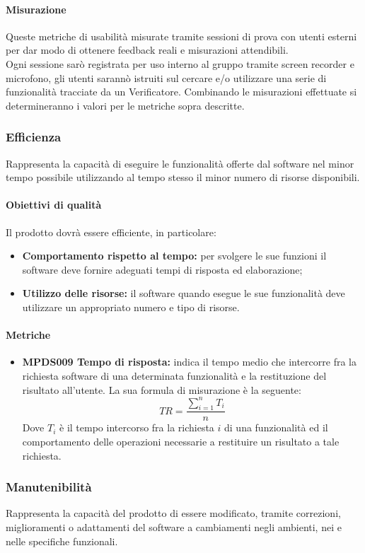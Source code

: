 \documentclass[NormeDiProgetto.tex]{subfiles}
\begin{document}
	\paragraph{Misurazione}
	Queste metriche di usabilità misurate tramite sessioni di prova con utenti esterni per dar modo di ottenere feedback reali e misurazioni attendibili.\\ Ogni sessione sarò registrata per uso interno al gruppo tramite screen recorder e microfono, gli utenti sarannò istruiti sul cercare e/o utilizzare una serie di funzionalità tracciate da un Verificatore.
	Combinando le misurazioni effettuate si determineranno i valori per le metriche sopra descritte.
	
	\subsubsection{Efficienza}
	Rappresenta la capacità di eseguire le funzionalità offerte dal software nel minor tempo possibile utilizzando al tempo stesso il minor numero di risorse disponibili.
	\paragraph{Obiettivi di qualità}
	Il prodotto dovrà essere efficiente, in particolare:
	\begin{itemize}
		\item \textbf{Comportamento rispetto al tempo:} per svolgere le sue funzioni il software deve fornire adeguati tempi di risposta ed elaborazione;
		\item \textbf{Utilizzo delle risorse:} il software quando esegue le sue funzionalità deve utilizzare un appropriato numero e tipo di risorse.
	\end{itemize}
	\paragraph{Metriche}
	\begin{itemize}
		\item \textbf{MPDS009 Tempo di risposta:} indica il tempo medio che intercorre fra la richiesta software di una determinata funzionalità e la restituzione del risultato all'utente. La sua formula di misurazione è la seguente: \[TR=\frac{\sum_{i=1}^n T_i}{n}\] Dove $ T_i $ è il tempo intercorso fra la richiesta $ i $ di una funzionalità ed il comportamento delle operazioni necessarie a restituire un risultato a tale richiesta.	
	\end{itemize}
	\subsubsection{Manutenibilità}
	Rappresenta la capacità del prodotto di essere modificato, tramite correzioni, miglioramenti o adattamenti del software a cambiamenti negli ambienti, nei  e nelle specifiche funzionali.
\end{document}

